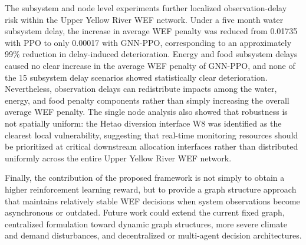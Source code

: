 \documentclass [a4paper,fleqn] {cas-dc}
\begin{document}
The subsystem and node level experiments further localized observation-delay risk within the Upper Yellow River WEF network. Under a five month water subsystem delay, the increase in average WEF penalty was reduced from 0.01735 with PPO to only 0.00017 with GNN-PPO, corresponding to an approximately 99\% reduction in delay-induced deterioration. Energy and food subsystem delays caused no clear increase in the average WEF penalty of GNN-PPO, and none of the 15 subsystem delay scenarios showed statistically clear deterioration. Nevertheless, observation delays can redistribute impacts among the water, energy, and food penalty components rather than simply increasing the overall average WEF penalty. The single node analysis also showed that robustness is not spatially uniform: the Hetao diversion interface W8 was identified as the clearest local vulnerability, suggesting that real-time monitoring resources should be prioritized at critical downstream allocation interfaces rather than distributed uniformly across the entire Upper Yellow River WEF network.

Finally, the contribution of the proposed framework is not simply to obtain a higher reinforcement learning reward, but to provide a graph structure approach that maintains relatively stable WEF decisions when system observations become asynchronous or outdated. Future work could extend the current fixed graph, centralized formulation toward dynamic graph structures, more severe climate and demand disturbances, and decentralized or multi-agent decision architectures.


\flushcolsend
\appendix

\setcounter{table}{0}
\renewcommand{\thetable}{S\arabic{table}}
\end{document}
